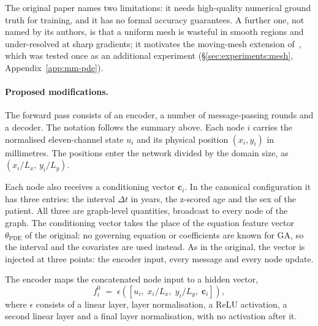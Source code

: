 The original paper names two limitations: it needs high-quality
numerical ground truth for training, and it has no formal accuracy
guarantees. A further one, not named by its authors, is that a uniform mesh
is wasteful in smooth regions and under-resolved at sharp gradients; it
motivates the moving-mesh extension of~\citet{Hu2024}, which was tested
once as an additional experiment (\S\ref{sec:experiments:mesh},
Appendix~\ref{app:mm-pde}).

\paragraph{Proposed modifications.}
The forward pass consists of an encoder, a number of message-passing
rounds and a decoder. The notation follows the summary above.
Each node $i$ carries the normalised eleven-channel state $u_i$ and its
physical position $(x_i, y_i)$ in millimetres. The positions enter the
network divided by the domain size, as $(x_i / L_x,\, y_i / L_y)$.

Each node also receives a conditioning vector $\mathbf{c}_i$. In the
canonical configuration it has three entries: the interval $\Delta t$ in
years, the z-scored age and the sex of the patient. All three are
graph-level quantities, broadcast to every node of the graph. The
conditioning vector takes the place of the equation feature vector
$\theta_{\text{PDE}}$ of the original: no governing equation or
coefficients are known for GA, so the interval and the covariates are used
instead. As in the original, the
vector is injected at three points: the encoder input, every message and
every node update.

The encoder maps the concatenated node input to a hidden vector,
\begin{equation}
  f_i^{0} \;=\; \epsilon\!\left(\left[u_i,\; x_i / L_x,\; y_i / L_y,\;
  \mathbf{c}_i\right]\right),
  \label{eq:method:encoder}
\end{equation}
where $\epsilon$ consists of a linear layer, layer normalisation, a ReLU
activation, a second linear layer and a final layer normalisation, with no
activation after it.

